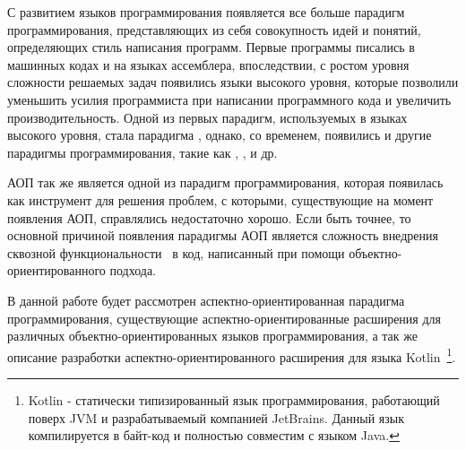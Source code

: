 \intro

С развитием языков программирования появляется все больше парадигм
программирования, представляющих из себя совокупность идей и понятий,
определяющих стиль написания программ.
Первые программы писались в машинных кодах и на языках ассемблера, впоследствии,
с ростом уровня сложности решаемых задач появились языки высокого уровня,
которые позволили уменьшить усилия программиста при написании программного кода
и увеличить производительность.
Одной из первых парадигм, используемых в языках высокого уровня, стала парадигма
, однако, со временем, появились и другие
парадигмы программирования, такие как ,
,  и др.

АОП так же является одной из парадигм программирования, которая появилась как
инструмент для решения проблем, с которыми, существующие на момент появления
АОП, справлялись недостаточно хорошо.
Если быть точнее, то основной причиной появления парадигмы АОП является
сложность внедрения сквозной функциональности~\cite{crosscutting_conserns} в
код, написанный при помощи объектно-ориентированного подхода.

В данной работе будет рассмотрен аспектно-ориентированная парадигма
программирования, существующие аспектно-ориентированные расширения для
различных объектно-ориентированных языков программирования, а так же описание
разработки аспектно-ориентированного расширения для языка Kotlin~\footnote{
Kotlin - статически типизированный язык программирования, работающий поверх JVM
и разрабатываемый компанией JetBrains. Данный язык компилируется в байт-код и
полностью совместим с языком Java.}.